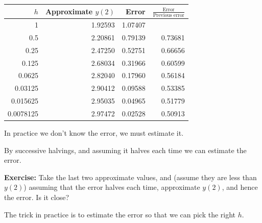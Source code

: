 \documentclass[10pt,aspectratio=169]{beamer}
\begin{document}
\begin{frame}
\hspace*{\fill}
\begin{tabular}{@{}rrrr@{}}
\toprule
$h$ & Approximate $y(2)$ & Error & $\frac{\text{Error}}{\text{Previous error}}$ \\
\midrule
1        & 1.92593 & 1.07407 & \\
0.5      & 2.20861 & 0.79139 & 0.73681 \\
0.25     & 2.47250 & 0.52751 & 0.66656 \\
0.125    & 2.68034 & 0.31966 & 0.60599 \\
0.0625   & 2.82040 & 0.17960 & 0.56184 \\
0.03125  & 2.90412 & 0.09588 & 0.53385 \\
0.015625 & 2.95035 & 0.04965 & 0.51779 \\
0.0078125& 2.97472 & 0.02528 & 0.50913 \\
\bottomrule
\end{tabular}
\hspace*{\fill}

\medskip
\pause

In practice we don't know the error, we must estimate it.

\medskip
\pause

By successive halvings, and assuming it halves each time we can estimate the
error.

\medskip
\pause

\textbf{Exercise:} Take the last two approximate values, and (assume they
are less than $y(2)$) assuming that the error halves each time, approximate
$y(2)$, and hence the error.  Is it close?

\medskip
\pause

The trick in practice is to estimate the error so that we can pick the right
$h$.

\end{frame}
\end{document}
